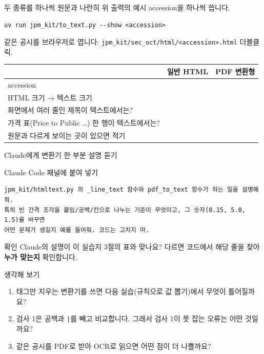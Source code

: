 \begin{frame}[fragile]{두 종류를 하나씩 원문과 나란히}
\small 위 출력의 예시 accession을 하나씩 씁니다.
\begin{Verbatim}
uv run jpm_kit/to_text.py --show <accession>
\end{Verbatim}
같은 공시를 브라우저로 엽니다: \verb|jpm_kit/sec_oct/html/<accession>.html| 더블클릭.

\footnotesize\renewcommand{\arraystretch}{1.15}
\begin{tabularx}{\textwidth}{@{}X p{3.6cm} p{3.6cm}@{}}
\toprule
 & \textbf{일반 HTML} & \textbf{PDF 변환형} \\
\midrule
accession & & \\[1pt] \arrayrulecolor{muted!35}\midrule\arrayrulecolor{black}
HTML 크기 → 텍스트 크기 & & \\[1pt] \arrayrulecolor{muted!35}\midrule\arrayrulecolor{black}
화면에서 여러 줄인 제목이 텍스트에서는? & & \\[1pt] \arrayrulecolor{muted!35}\midrule\arrayrulecolor{black}
가격 표(Price to Public …) 한 행이 텍스트에서는? & & \\[1pt] \arrayrulecolor{muted!35}\midrule\arrayrulecolor{black}
원문과 다르게 보이는 곳이 있으면 적기 & & \\[1pt]
\bottomrule
\end{tabularx}
\end{frame}

\begin{frame}[fragile]{Claude에게 변환기 한 부분 설명 듣기}
\begin{block}{Claude Code 패널에 붙여 넣기}
\begin{Verbatim}
jpm_kit/htmltext.py 의 _line_text 함수와 pdf_to_text 함수가 하는 일을 설명해줘.
특히 빈 간격 조각을 붙임/공백/칸으로 나누는 기준이 무엇이고, 그 숫자(0.15, 5.0, 1.5)를 바꾸면
어떤 문제가 생길지 예를 들어줘. 코드는 고치지 마.
\end{Verbatim}
\end{block}
\vspace{0.4em}
\begin{alertblock}{확인}
Claude의 설명이 이 실습지 3절의 표와 맞나요? 다르면 코드에서 해당 줄을 찾아 \textbf{누가 맞는지} 확인합니다.
\end{alertblock}
\end{frame}

\begin{frame}{생각해 보기}
\begin{enumerate}\setlength\itemsep{10pt}
\item 태그만 지우는 변환기를 쓰면 다음 실습(규칙으로 값 뽑기)에서 무엇이 틀어질까요?
\item 검사 1은 공백과 \texttt{|}를 빼고 비교합니다. 그래서 검사 1이 \alert{못} 잡는 오류는 어떤 것일까요?
\item 같은 공시를 PDF로 받아 OCR로 읽으면 어떤 점이 더 나쁠까요?
\end{enumerate}
\end{frame}
